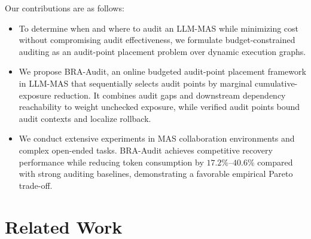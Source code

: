 \documentclass[letterpaper]{article} %
\begin{document}
Our contributions are as follows:
\begin{itemize}[leftmargin=2em]
    \item To determine when and where to audit an LLM-MAS while minimizing cost without compromising audit effectiveness, we formulate budget-constrained auditing as an audit-point placement problem over dynamic execution graphs.
    
    
    

    \item We propose BRA-Audit, an online budgeted audit-point placement framework in LLM-MAS that sequentially selects audit points by marginal cumulative-exposure reduction. It combines audit gaps and downstream dependency reachability to weight unchecked exposure, while verified audit points bound audit contexts and localize rollback.
    

    \item We conduct extensive experiments in MAS collaboration environments and complex open-ended tasks. BRA-Audit achieves competitive recovery performance while reducing token consumption by \(17.2\%\)--\(40.6\%\) compared with strong auditing baselines, demonstrating a favorable empirical Pareto trade-off.
\end{itemize}

\section{Related Work}


\end{document}
